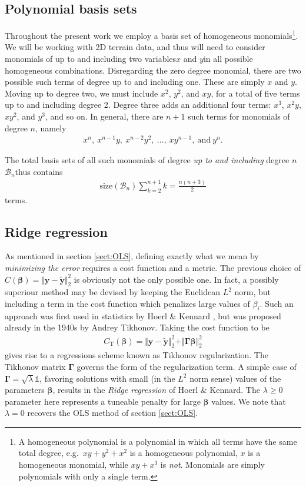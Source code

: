 \documentclass[a4paper]{article}
\begin{document}
\begin{multicols}{2}
\subsection{Polynomial basis sets}
Throughout the present work we employ a basis set of homogeneous monomials\footnote{A homogeneous polynomial is a polynomial in which all terms have the same total degree, e.g.\ $xy+y^2+x^2$ is a homogeneous polynomial, $x$ is a homogeneous monomial, while $xy+x^3$ is \textit{not}. Monomials are simply polynomials with only a single term.}. We will be working with 2D terrain data, and thus will need to consider monomials of up to and including two variables\textemdash $x$ and $y$\textemdash in all possible homogeneous combinations. Disregarding the zero degree monomial, there are two possible such terms of degree up to and including one. These are simply $x$ and $y$. Moving up to degree two, we must include $x^2$, $y^2$, and $xy$, for a total of five terms up to and including degree 2. Degree three adds an additional four terms: $x^3$, $x^2y$, $xy^2$, and $y^3$, and so on. In general, there are $n+1$ such terms for monomials of degree $n$, namely 
\begin{align}
x^n,\ x^{n-1}y, \ x^{n-2}y^2, \ \dots, \ xy^{n-1}, \ \text{and} \ y^n. \nonumber
\end{align}

The total basis sets of all such monomials of degree \textit{up to and including} degree $n$\textemdash $\mathcal{B}_n$\textemdash thus contains 
\begin{align}
\text{size}(\mathcal{B}_n) \sum_{k=2}^{n+1}k = \frac{n(n+3)}{2}
\end{align}
terms. 
\subsection{Ridge regression}
As mentioned in section \ref{sect:OLS}, defining exactly what we mean by \textit{minimizing the error} requires a cost function and a metric. The previous choice of $C(\bm\beta)=\Vert \mathbf{y}-\tilde{\mathbf{y}}\Vert_2^2$ is obviously not the only possible one. In fact, a possibly superiour method may be devised by keeping the Euclidean $L^2$ norm, but including a term in the cost function which penalizes large values of $\beta_i$. Such an approach was first used in statistics by Hoerl \& Kennard \autocite{hoerl1970ridge}, but was proposed already in the 1940s by Andrey Tikhonov\autocite{tikhonov1943stability}. Taking the cost function to be 
\begin{align}
C_\text{T}(\bm\beta) = \Vert \mathbf{y}-\tilde{\mathbf{y}}\Vert_2^2 + \Vert \bm\Gamma \bm\beta \Vert_2^2
\end{align}
gives rise to a regressions scheme known as Tikhonov regularization. The Tikhonov matrix $\bm\Gamma$ governs the form of the regularization term. A simple case of $\bm\Gamma=\sqrt{\lambda} \mathds{1}$, favoring solutions with small (in the $L^2$ norm sense) values of the parameters $\bm\beta$, results in the \textit{Ridge regression} of Hoerl \& Kennard. The $\lambda\ge 0$ parameter here represents a tuneable penalty for large $\bm\beta$ values. We note that $\lambda=0$ recovers the OLS method of section \ref{sect:OLS}.


\end{multicols}
\end{document}
